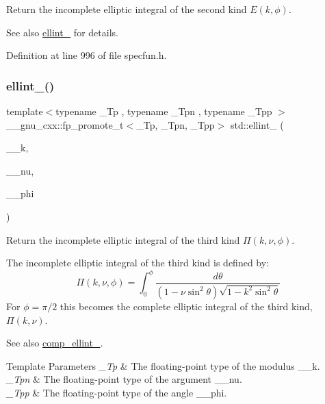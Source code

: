 Return the incomplete elliptic integral of the second kind $ E(k,\phi) $. 

\begin{DoxySeeAlso}{See also}
\hyperlink{group__cxx17__math__spec__func_gad64cb9babb7837d585912b1a94b2cb7d}{ellint\+\_} for details. 
\end{DoxySeeAlso}


Definition at line 996 of file specfun.\+h.

\mbox{\label{group__cxx17__math__spec__func_gaac0240d1e7e401e652b9d1adf4c7e029}} 
\subsubsection{\texorpdfstring{ellint\+\_()}{ellint\_3()}}
{\footnotesize\ttfamily template$<$typename \+\_\+\+Tp , typename \+\_\+\+Tpn , typename \+\_\+\+Tpp $>$ \\
\+\_\+\+\_\+gnu\+\_\+cxx\+::fp\+\_\+promote\+\_\+t$<$\+\_\+\+Tp, \+\_\+\+Tpn, \+\_\+\+Tpp$>$ std\+::ellint\+\_ (\begin{DoxyParamCaption}\item[{\+\_\+\+Tp}]{\+\_\+\+\_\+k,  }\item[{\+\_\+\+Tpn}]{\+\_\+\+\_\+nu,  }\item[{\+\_\+\+Tpp}]{\+\_\+\+\_\+phi }\end{DoxyParamCaption})\hspace{0.3cm}{\ttfamily [inline]}}



Return the incomplete elliptic integral of the third kind $ \Pi(k,\nu,\phi) $. 

The incomplete elliptic integral of the third kind is defined by\+: \[ \Pi(k,\nu,\phi) = \int_0^{\phi} \frac{d\theta} {(1 - \nu \sin^2\theta) \sqrt{1 - k^2 \sin^2\theta}} \] For $ \phi= \pi/2 $ this becomes the complete elliptic integral of the third kind, $ \Pi(k,\nu) $. \begin{DoxySeeAlso}{See also}
\hyperlink{group__cxx17__math__spec__func_ga80419d323d3231870bd588525e818974}{comp\+\_\+ellint\+\_}.
\end{DoxySeeAlso}

\begin{DoxyTemplParams}{Template Parameters}
{\em \+\_\+\+Tp} & The floating-\/point type of the modulus {\ttfamily \+\_\+\+\_\+k}. \\
\hline
{\em \+\_\+\+Tpn} & The floating-\/point type of the argument {\ttfamily \+\_\+\+\_\+nu}. \\
\hline
{\em \+\_\+\+Tpp} & The floating-\/point type of the angle {\ttfamily \+\_\+\+\_\+phi}. \\
\hline
\end{DoxyTemplParams}

